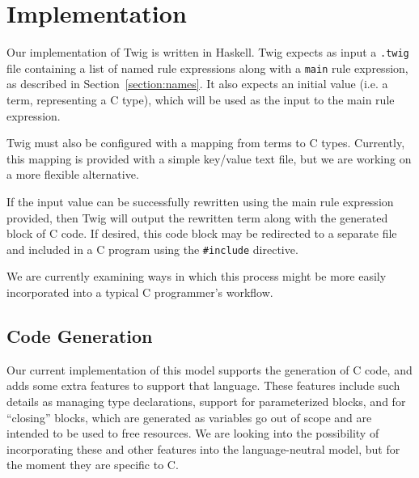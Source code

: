
\section{Implementation}

Our implementation of Twig is written in Haskell. Twig expects as input a \texttt{.twig} file containing a list of named rule expressions along with a \texttt{main} rule expression, as described in Section~\ref{section:names}. It also expects an initial value (i.e. a term, representing a C type), which will be used as the input to the main rule expression.

Twig must also be configured with a mapping from terms to C types. Currently, this mapping is provided with a simple key/value text file, but we are working on a more flexible alternative.

If the input value can be successfully rewritten using the main rule expression provided, then Twig will output the rewritten term along with the generated block of C code. If desired, this code block may be redirected to a separate file and included in a C program using the \texttt{\#include} directive.

We are currently examining ways in which this process might be more easily incorporated into a typical C programmer's workflow.

\subsection{Code Generation}

Our current implementation of this model supports the generation of C code, and adds some extra features to support that language. These features include such details as managing type declarations, support for parameterized blocks, and for ``closing'' blocks, which are generated as variables go out of scope and are intended to be used to free resources. We are looking into the possibility of incorporating these and other features into the language-neutral model, but for the moment they are specific to C.
